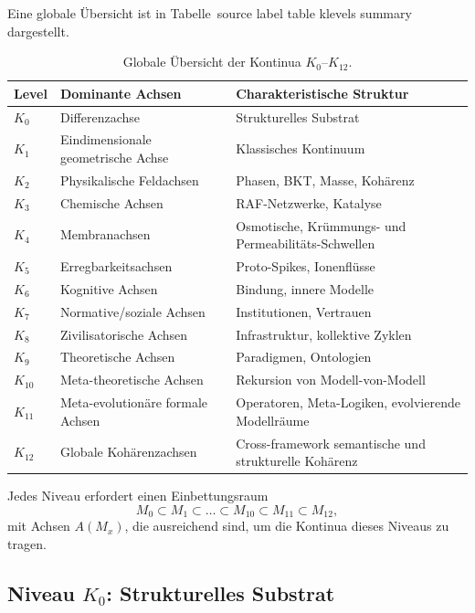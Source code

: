 Eine globale Übersicht ist in Tabelle~source label table klevels summary dargestellt.

\begin{table}[h!]
\centering
\begingroup
\footnotesize
\RaggedRight
\setlength{\tabcolsep}{4pt}
\begin{tabular}{@{}L{0.10\textwidth}L{0.25\textwidth}L{0.49\textwidth}@{}}
\hline
Level & Dominante Achsen & Charakteristische Struktur \\
\hline
\(K_0\) & Differenzachse & Strukturelles Substrat \\
\(K_1\) & Eindimensionale geometrische Achse & Klassisches Kontinuum \\
\(K_2\) & Physikalische Feldachsen & Phasen, BKT, Masse, Kohärenz \\
\(K_3\) & Chemische Achsen & RAF-Netzwerke, Katalyse \\
\(K_4\) & Membranachsen & Osmotische, Krümmungs- und Permeabilitäts-Schwellen \\
\(K_5\) & Erregbarkeitsachsen & Proto-Spikes, Ionenflüsse \\
\(K_6\) & Kognitive Achsen & Bindung, innere Modelle \\
\(K_7\) & Normative/soziale Achsen & Institutionen, Vertrauen \\
\(K_8\) & Zivilisatorische Achsen & Infrastruktur, kollektive Zyklen \\
\(K_9\) & Theoretische Achsen & Paradigmen, Ontologien \\
\(K_{10}\) & Meta-theoretische Achsen & Rekursion von Modell-von-Modell \\
\(K_{11}\) & Meta-evolutionäre formale Achsen & Operatoren, Meta-Logiken, evolvierende Modellräume \\
\(K_{12}\) & Globale Kohärenzachsen & Cross-framework semantische und strukturelle Kohärenz \\
\hline
\end{tabular}
\endgroup
\caption{Globale Übersicht der Kontinua \texorpdfstring{\(K_0\)}{K0}–\(K_{12}\).}
\label{tab:klevels-summary}
\end{table}

Jedes Niveau erfordert einen Einbettungsraum
\[
   M_0 \subset M_1 \subset \dots \subset M_{10} \subset M_{11} \subset M_{12},
\]
mit Achsen \(A(M_x)\), die ausreichend sind, um die Kontinua dieses Niveaus zu tragen.

\subsection{Niveau \texorpdfstring{\texorpdfstring{$K_0$}{K\_0}}{K0}: Strukturelles Substrat}

